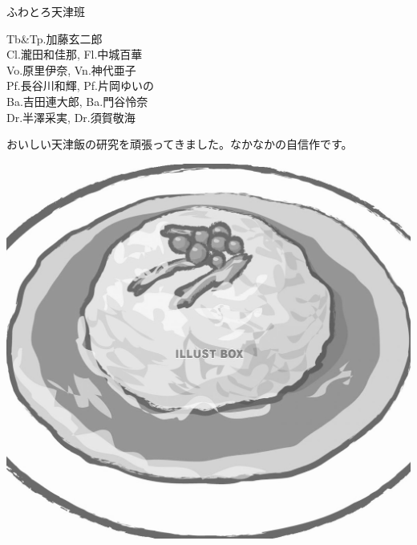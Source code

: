 \documentclass[a4paper]{article}
\begin{document}
\begin{minipage}{\textwidth - 0.25\textheight}
    \flushleft
    \Huge \vspace{1em}ふわとろ天津班\vspace{1em}\normalsize \\
    \begin{minipage}{19em}
        \flushleft
        \Large
        Tb\&Tp.加藤玄二郎\\Cl.瀧田和佳那, Fl.中城百華\\Vo.原里伊奈, Vn.神代亜子\\Pf.長谷川和輝, Pf.片岡ゆいの\\Ba.吉田連大郎, Ba.門谷怜奈\\Dr.半澤采実, Dr.須賀敬海
    \end{minipage}
    \begin{minipage}{\textwidth - 18em}
        \flushleft
        \large
        \vspace{1em}
        おいしい天津飯の研究を頑張ってきました。なかなかの自信作です。
    \end{minipage}
\end{minipage}
\begin{minipage}{0.25\textheight}
    \flushleft
    \includegraphics[width=0.25\textheight]{./FULLHOUSE/resources/8.jpeg}
\end{minipage}
\end{document}
